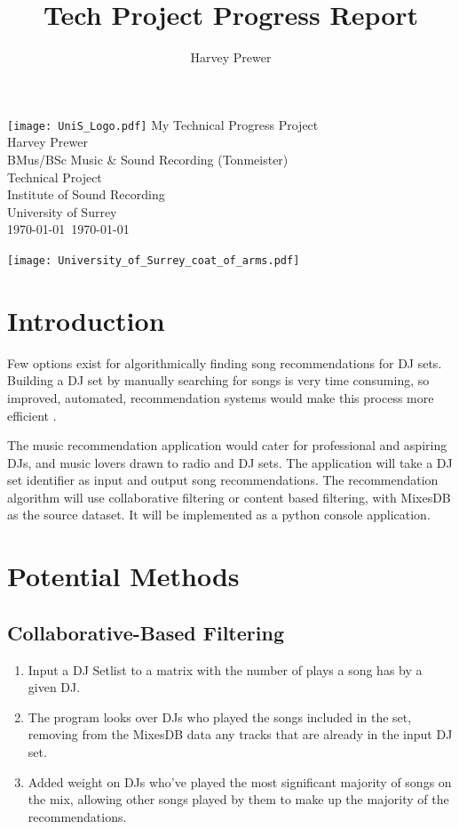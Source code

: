 \documentclass[11pt,titlepage,oneside]{book}
\title{Tech Project Progress Report}
\author{Harvey Prewer}
\newcommand{\LongTitle}{My Technical Progress Project}
\newcommand{\Me}{Harvey Prewer}
\begin{document}
\begin{titlepage}

\thispagestyle{empty}
\hfill\texttt{[image: UniS\_Logo.pdf]}
{\sf
	\centering
	\null\vfil\vfil
	{
		\huge\LongTitle\\
	}
	\vfil\vfil\vfil
	{
		\Large\Me\\
	}
	\vfil\vfil\vfil
	{
		\Large{}BMus/BSc Music \& Sound Recording (Tonmeister)\\
		Technical Project\\
	}
	\vfil\vfil
	{
		\Large{}Institute of Sound Recording\\
		University of Surrey\\
	}
	\vfil
	{
		\Large\MyMonth\today~\MyYear\today\\}
}

{
	\texttt{[image: University\_of\_Surrey\_coat\_of\_arms.pdf]}
	\vspace{-.4in}
}

\end{titlepage}
\section{Introduction}
	 \begin{flushleft}
	 Few options exist for algorithmically finding song recommendations for DJ sets. Building a DJ set by manually searching for songs is very time consuming, so improved, automated, recommendation systems would make this process more efficient . 
	\end{flushleft}

\begin{flushleft}
	 The music recommendation application would cater for professional and aspiring DJs, and music lovers drawn to radio and DJ sets. The application will take a DJ set identifier as input and output song recommendations. The recommendation algorithm will use collaborative filtering or content based filtering, with MixesDB as the source dataset. It will be implemented as a python console application.
	\end{flushleft}
\section{Potential Methods}
	 \subsection{Collaborative-Based Filtering}
	 \begin{enumerate}
	 	
	 	\item  Input a DJ Setlist to a matrix with the number of plays a song has by a given DJ.
	 	\item The program looks over DJs who played the songs included in the set, removing from the MixesDB data any tracks that are already in the input DJ set.
	 	\item Added weight on DJs who've played the most significant majority of songs on the mix, allowing other songs played by them to make up the majority of the recommendations.
	 \end{enumerate}
\end{document}
